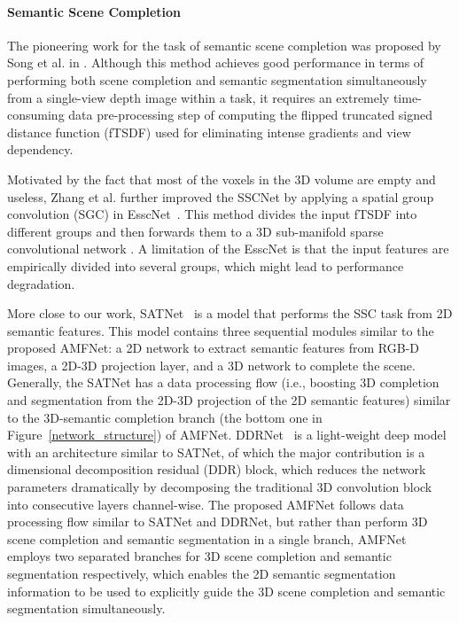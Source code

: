 \documentclass[letterpaper]{article} \usepackage{aaai20}  \usepackage{times}  \usepackage{helvet} \usepackage{courier}  \usepackage[hyphens]{url}  \usepackage{graphicx} \urlstyle{rm} \def\UrlFont{\rm}  \usepackage{graphicx}  \frenchspacing  \setlength{\pdfpagewidth}{8.5in}  \setlength{\pdfpageheight}{11in}
\begin{document}
\paragraph{Semantic Scene Completion} 
The pioneering work for the task of semantic scene completion was proposed by Song et al. in \cite{Song2016SemanticSC}. Although this method achieves good performance in terms of performing both scene completion and semantic segmentation simultaneously from a single-view depth image within a task, it requires an extremely time-consuming data pre-processing step of computing the flipped truncated signed distance function (fTSDF) used for eliminating intense gradients and view dependency.

Motivated by the fact that most of the voxels in the 3D volume are empty and useless,
Zhang et al. further improved the SSCNet by applying a spatial group convolution (SGC) in EsscNet~\cite{Zhang2018EfficientSS}. This method divides the input fTSDF into different groups and then forwards them to a 3D sub-manifold sparse convolutional network \cite{Graham20173DSS}. A limitation of the EsscNet is that the input features are empirically divided into several groups, which might lead to performance degradation.

More close to our work, SATNet~\cite{Liu2018SeeAT} is a model that performs the SSC task from 2D semantic features. This model contains three sequential modules similar to the proposed AMFNet: a 2D network to extract semantic features from RGB-D images, a 2D-3D projection layer, and a 3D network to complete the scene. Generally, the SATNet has a data processing flow (i.e., boosting 3D completion and segmentation from the 2D-3D projection of the 2D semantic features) similar to the 3D-semantic completion branch (the bottom one in Figure~\ref{network_structure}) of AMFNet. DDRNet~\cite{Li2019RGBDBD} is a light-weight deep model with an architecture similar to SATNet, of which the major contribution is a dimensional decomposition residual (DDR) block, which reduces the network parameters dramatically by decomposing the traditional 3D convolution block into consecutive layers channel-wise. The proposed AMFNet follows data processing flow similar to SATNet and DDRNet, but rather than perform 3D scene completion and semantic segmentation in a single branch, AMFNet employs two separated branches for 3D scene completion and semantic segmentation respectively, which enables the 2D semantic segmentation information to be used to explicitly guide the 3D scene completion and semantic segmentation simultaneously.
\end{document}

